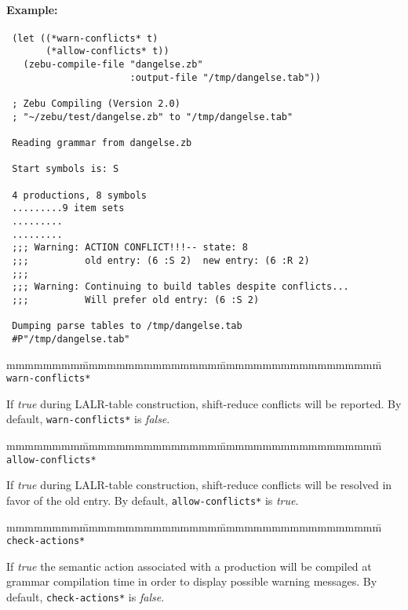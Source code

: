 \paragraph {Example:}
{\tt \begin{verbatim}
 (let ((*warn-conflicts* t)
       (*allow-conflicts* t))
   (zebu-compile-file "dangelse.zb" 
                      :output-file "/tmp/dangelse.tab"))

 ; Zebu Compiling (Version 2.0)
 ; "~/zebu/test/dangelse.zb" to "/tmp/dangelse.tab"

 Reading grammar from dangelse.zb

 Start symbols is: S

 4 productions, 8 symbols
 .........9 item sets
 .........
 .........
 ;;; Warning: ACTION CONFLICT!!!-- state: 8
 ;;;          old entry: (6 :S 2)  new entry: (6 :R 2)
 ;;;          
 ;;; Warning: Continuing to build tables despite conflicts...
 ;;;          Will prefer old entry: (6 :S 2)

 Dumping parse tables to /tmp/dangelse.tab
 #P"/tmp/dangelse.tab"
\end{verbatim}}

\begin{tabbing}
mmmmmmmm\=mmmmmmmmmmmmmmm\=mmmmmmmmmmmmmmmmmm\=\kill
{\tt *warn-conflicts*}                        \>\> 
\end{tabbing}

If {\em true} during LALR-table construction, shift-reduce conflicts
will be reported.  By default, {\tt *warn-conflicts*} is {\em false}.

\begin{tabbing}
mmmmmmmm\=mmmmmmmmmmmmmmm\=mmmmmmmmmmmmmmmmmm\=\kill
{\tt *allow-conflicts*}                        \>\> 
\end{tabbing}

If {\em true} during LALR-table construction, shift-reduce conflicts will be
resolved in favor of the old entry.  By default, {\tt *allow-conflicts*}
is {\em true}.

\begin{tabbing}
mmmmmmmm\=mmmmmmmmmmmmmmm\=mmmmmmmmmmmmmmmmmm\=\kill
{\tt *check-actions*}                        \>\> 
\end{tabbing}

If {\em true} the semantic action associated with a production will be
compiled at grammar compilation time in order to display possible
warning messages. By default, {\tt *check-actions*} is {\em false}.

